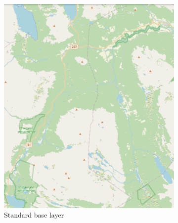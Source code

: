 \begin{figure}[h]
     \centering
     \begin{subfigure}[b]{0.45\textwidth}
         \centering
         \includegraphics[width=\textwidth]{figures/base_layer_standard.pdf}
         \caption{Standard base layer}
         \label{fig:base_layer_standard}
     \end{subfigure}
     \hfill
     \begin{subfigure}[b]{0.45\textwidth}
         \centering

\end{subfigure}
\end{figure}
